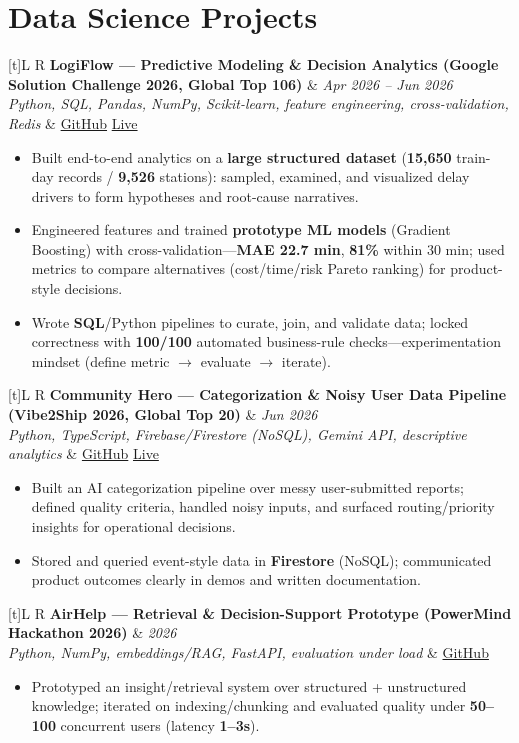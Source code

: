 \documentclass[a4paper,10pt]{article}
\newcommand{\resumeProject}[4]{%
  \vspace{0.35mm}
  \noindent
  \begin{tabularx}{\textwidth}[t]{L R}
    \textbf{#1} & \textit{#3} \\
    \textit{#2} & #4 \\
  \end{tabularx}
  \vspace{-0.35mm}%
}
\begin{document}
\section{Data Science Projects}
\small

\resumeProject
  {LogiFlow --- Predictive Modeling \& Decision Analytics (Google Solution Challenge 2026, Global Top 106)}
  {Python, SQL, Pandas, NumPy, Scikit-learn, feature engineering, cross-validation, Redis}
  {Apr 2026 -- Jun 2026}
  {\href{https://github.com/Ojas-Srivastava05/LogiFlow-Solution-Challenge-2026}{GitHub} \textbar{} \href{https://logi-flow-solution-challenge-2026.vercel.app/}{Live}}
\begin{itemize}
  \item Built end-to-end analytics on a \textbf{large structured dataset} (\textbf{15,650} train-day records / \textbf{9,526} stations): sampled, examined, and visualized delay drivers to form hypotheses and root-cause narratives.
  \item Engineered features and trained \textbf{prototype ML models} (Gradient Boosting) with cross-validation---\textbf{MAE 22.7 min}, \textbf{81\%} within 30 min; used metrics to compare alternatives (cost/time/risk Pareto ranking) for product-style decisions.
  \item Wrote \textbf{SQL}/Python pipelines to curate, join, and validate data; locked correctness with \textbf{100/100} automated business-rule checks---experimentation mindset (define metric $\rightarrow$ evaluate $\rightarrow$ iterate).
\end{itemize}

\resumeProject
  {Community Hero --- Categorization \& Noisy User Data Pipeline (Vibe2Ship 2026, Global Top 20)}
  {Python, TypeScript, Firebase/Firestore (NoSQL), Gemini API, descriptive analytics}
  {Jun 2026}
  {\href{https://github.com/Ojas-Srivastava05/community-hero}{GitHub} \textbar{} \href{https://community-hero-987477089222.asia-south1.run.app}{Live}}
\begin{itemize}
  \item Built an AI categorization pipeline over messy user-submitted reports; defined quality criteria, handled noisy inputs, and surfaced routing/priority insights for operational decisions.
  \item Stored and queried event-style data in \textbf{Firestore} (NoSQL); communicated product outcomes clearly in demos and written documentation.
\end{itemize}

\resumeProject
  {AirHelp --- Retrieval \& Decision-Support Prototype (PowerMind Hackathon 2026)}
  {Python, NumPy, embeddings/RAG, FastAPI, evaluation under load}
  {2026}
  {\href{https://github.com/Ojas-Srivastava05/AirHelp-AI-Airport-Assistant}{GitHub}}
\begin{itemize}
  \item Prototyped an insight/retrieval system over structured + unstructured knowledge; iterated on indexing/chunking and evaluated quality under \textbf{50--100} concurrent users (latency \textbf{1--3s}).
\end{itemize}
\end{document}
